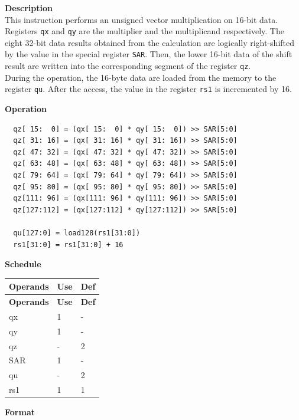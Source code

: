 \textbf{Description}\\
This instruction performs an unsigned vector multiplication on 16-bit data. Registers \lstinline{qx} and \lstinline{qy} are the multiplier and the multiplicand respectively. The eight 32-bit data results obtained from the calculation are logically right-shifted by the value in the special register \lstinline{SAR}. Then, the lower 16-bit data of the shift result are written into the corresponding segment of the register \lstinline{qz}. \\ During the operation, the 16-byte data are loaded from the memory to the register \lstinline{qu}. After the access, the value in the register \lstinline{rs1} is incremented by 16.

\textbf{Operation}\\
\begin{lstlisting}
  qz[ 15:  0] = (qx[ 15:  0] * qy[ 15:  0]) >> SAR[5:0]
  qz[ 31: 16] = (qx[ 31: 16] * qy[ 31: 16]) >> SAR[5:0]
  qz[ 47: 32] = (qx[ 47: 32] * qy[ 47: 32]) >> SAR[5:0]
  qz[ 63: 48] = (qx[ 63: 48] * qy[ 63: 48]) >> SAR[5:0]
  qz[ 79: 64] = (qx[ 79: 64] * qy[ 79: 64]) >> SAR[5:0]
  qz[ 95: 80] = (qx[ 95: 80] * qy[ 95: 80]) >> SAR[5:0]
  qz[111: 96] = (qx[111: 96] * qy[111: 96]) >> SAR[5:0]
  qz[127:112] = (qx[127:112] * qy[127:112]) >> SAR[5:0]

  qu[127:0] = load128(rs1[31:0])
  rs1[31:0] = rs1[31:0] + 16
\end{lstlisting}


\textbf{Schedule}\\
\begin{longtable}[c]{|l|l|l|}
    \hline
    \rowcolor{lightgray}
    \textbf{Operands} & \textbf{Use} & \textbf{Def} \\\hline
    \endfirsthead
    \hline
    \rowcolor{lightgray}
     \textbf{Operands} & \textbf{Use} & \textbf{Def} \\\hline
    \endhead
    \hline
    \endfoot

    qx & 1 & - \\\hline
  qy & 1 & - \\\hline
     qz & - & 2 \\\hline
    SAR & 1 & - \\\hline
    qu & - & 2 \\\hline
    rs1 & 1 & 1

\end{longtable}

\textbf{Format}\\

